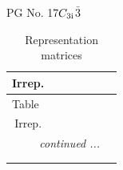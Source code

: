 \documentclass[fleqn,8pt,landscape]{jsarticle}
\begin{document}
\setcounter{MaxMatrixCols}{32}

\renewcommand{\tablename}{Table~}
\renewcommand{\figurename}{Figure~}
\begin{center}
\LARGE
PG No. 17\quad$C_{\rm 3i}$\quad$\bar{3}$\quad[ trigonal ]
\end{center}
\renewcommand{\arraystretch}{1.2}
\begin{longtable}{ccccccc}
\caption{Representation matrices}
 \\
 \hline \hline
Irrep. &  &  &  &  &  &  \\ \hline \endfirsthead

\multicolumn{6}{l}{\tablename\ \thetable{}} \\
 \hline \hline
Irrep. &  &  &  &  &  &  \\ \hline \endhead

 \hline \hline
\multicolumn{6}{r}{\footnotesize\it continued ...} \\ \endfoot

 \hline \hline
\multicolumn{6}{r}{} \\ \endlastfoot


\end{longtable}
\end{document}
